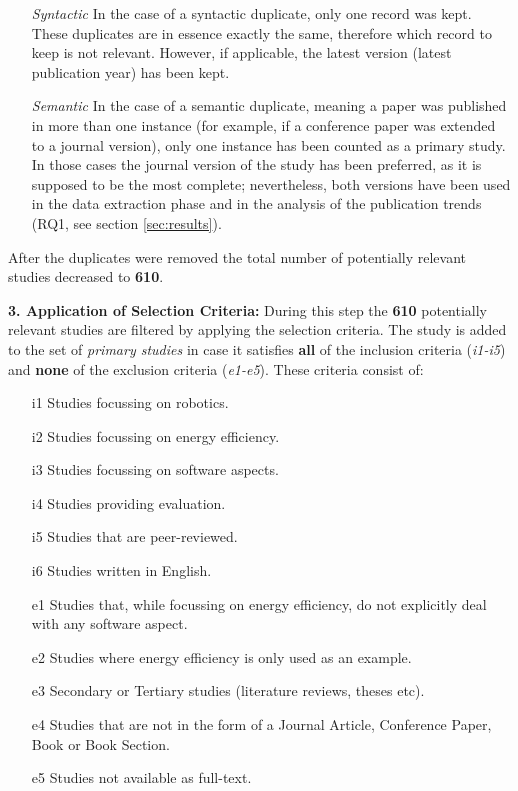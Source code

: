 \vspace{1mm}

\begin{enumerate}
    \item[\textit{Syntactic}] In the case of a syntactic duplicate, only one record was kept. 
    These duplicates are in essence exactly the same, therefore which record to keep is not relevant.
    However, if applicable, the latest version (latest publication year) has been kept.

    \item[\textit{Semantic}] In the case of a semantic duplicate, meaning a paper was published in more than one instance 
    (for example, if a conference paper was extended to a journal version), only one instance has been counted as a primary study. 
    In those cases the journal version of the study has been preferred, as it is supposed to be the most complete; nevertheless, 
    both versions have been used in the data extraction phase and in the analysis of the publication trends (RQ1, see section \ref{sec:results}).

\end{enumerate}
After the duplicates were removed the total number of potentially relevant studies decreased to \textbf{610}.

\vspace{5mm}

\noindent\textbf{3. Application of Selection Criteria:}
During this step the \textbf{610} potentially relevant studies are filtered by applying the selection criteria. 
The study is added to the set of \textit{primary studies} in case it satisfies \textbf{all} of the inclusion criteria (\textit{i1-i5}) and \textbf{none} of the exclusion criteria (\textit{e1-e5}). 
These criteria consist of:
\begin{itemize}
    \item[i1] Studies focussing on robotics.
	\item[i2] Studies focussing on energy efficiency.
    \item[i3] Studies focussing on software aspects.
    \item[i4] Studies providing evaluation.
    \item[i5] Studies that are peer-reviewed.
    \item[i6] Studies written in English.
    
	\item[e1] Studies that, while focussing on energy efficiency, do not explicitly deal with any software aspect.
    \item[e2] Studies where energy efficiency is only used as an example.
    \item[e3] Secondary or Tertiary studies (literature reviews, theses etc).
    \item[e4] Studies that are not in the form of a Journal Article, Conference Paper, Book or Book Section.
    \item[e5] Studies not available as full-text.
\end{itemize}

